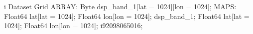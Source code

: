 \begin{vcode}{i}
Dataset {
    Grid {
     ARRAY:
        Byte dsp_band_1[lat = 1024][lon = 1024];
     MAPS:
        Float64 lat[lat = 1024];
        Float64 lon[lon = 1024];
    } dsp_band_1;
    Float64 lat[lat = 1024];
    Float64 lon[lon = 1024];
} i92098065016;
\end{vcode}
